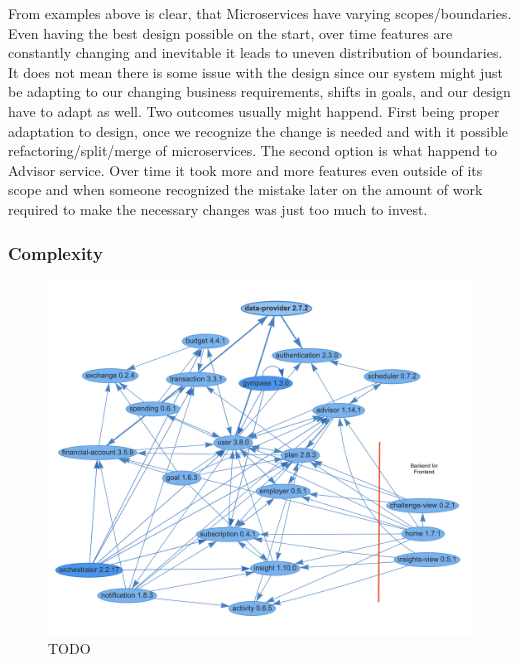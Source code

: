 From examples above is clear, that Microservices have varying scopes/boundaries. Even having the best design possible on the start, over time features are constantly changing and inevitable it leads to uneven distribution of boundaries. It does not mean there is some issue with the design since our system might just be adapting to our changing business requirements, shifts in goals, and our design have to adapt as well. Two outcomes usually might happend. First being proper adaptation to design, once we recognize the change is needed and with it possible refactoring/split/merge of microservices. The second option is what happend to Advisor service. Over time it took more and more features even outside of its scope and when someone recognized the mistake later on the amount of work required to make the necessary changes was just too much to invest.

\subsubsection{Complexity}

\begin{figure}
    \centering
    \includegraphics[width=\textwidth]{images/microservices-current-commented.png}
    \caption{TODO \label{img:microservices-current-commented}}
\end{figure}
